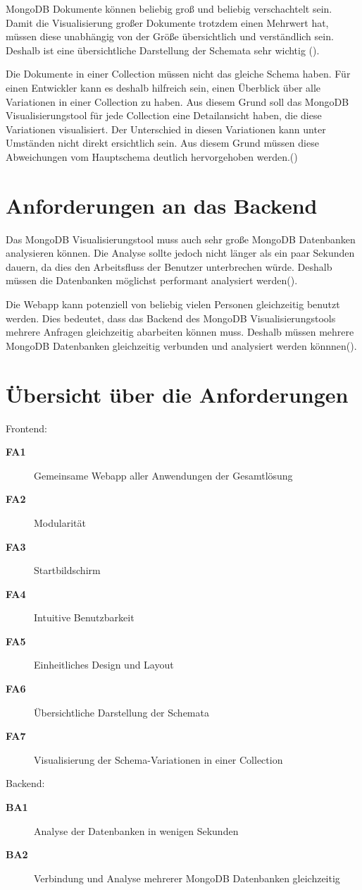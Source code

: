 MongoDB Dokumente können beliebig groß und beliebig verschachtelt sein.
Damit die Visualisierung großer Dokumente trotzdem einen Mehrwert hat, müssen diese unabhängig von der Größe übersichtlich und verständlich sein.
Deshalb ist eine übersichtliche Darstellung der Schemata sehr wichtig ().

Die Dokumente in einer Collection müssen nicht das gleiche Schema haben.
Für einen Entwickler kann es deshalb hilfreich sein, einen Überblick über alle Variationen in einer Collection zu haben.
Aus diesem Grund soll das MongoDB Visualisierungstool für jede Collection eine Detailansicht haben, die diese Variationen visualisiert.
Der Unterschied in diesen Variationen kann unter Umständen nicht direkt ersichtlich sein.
Aus diesem Grund müssen diese Abweichungen vom Hauptschema deutlich hervorgehoben werden.()

\section{Anforderungen an das Backend}
\label{sec:anf_backend}

Das MongoDB Visualisierungstool muss auch sehr große MongoDB Datenbanken analysieren können.
Die Analyse sollte jedoch nicht länger als ein paar Sekunden dauern, da dies den Arbeitsfluss der Benutzer unterbrechen würde.
Deshalb müssen die Datenbanken möglichst performant analysiert werden().

Die Webapp kann potenziell von beliebig vielen Personen gleichzeitig benutzt werden.
Dies bedeutet, dass das Backend des MongoDB Visualisierungstools mehrere Anfragen gleichzeitig abarbeiten können muss.
Deshalb müssen mehrere MongoDB Datenbanken gleichzeitig verbunden und analysiert werden könnnen().


\section{Übersicht über die Anforderungen}
\label{sec:anf_uebersicht}

Frontend:

\begin{description}
    \item[\textbf{FA1}\label{itm:fa1}] Gemeinsame Webapp aller Anwendungen der Gesamtlösung
    \item[\textbf{FA2}\label{itm:fa2}] Modularität
    \item[\textbf{FA3}\label{itm:fa3}] Startbildschirm
    \item[\textbf{FA4}\label{itm:fa4}] Intuitive Benutzbarkeit
    \item[\textbf{FA5}\label{itm:fa5}] Einheitliches Design und Layout
    \item[\textbf{FA6}\label{itm:fa6}] Übersichtliche Darstellung der Schemata
    \item[\textbf{FA7}\label{itm:fa7}] Visualisierung der Schema-Variationen in einer Collection
\end{description}

Backend:

\begin{description}
    \item[\textbf{BA1}\label{itm:ba1}] Analyse der Datenbanken in wenigen Sekunden
    \item[\textbf{BA2}\label{itm:ba2}] Verbindung und Analyse mehrerer MongoDB Datenbanken gleichzeitig
\end{description}

